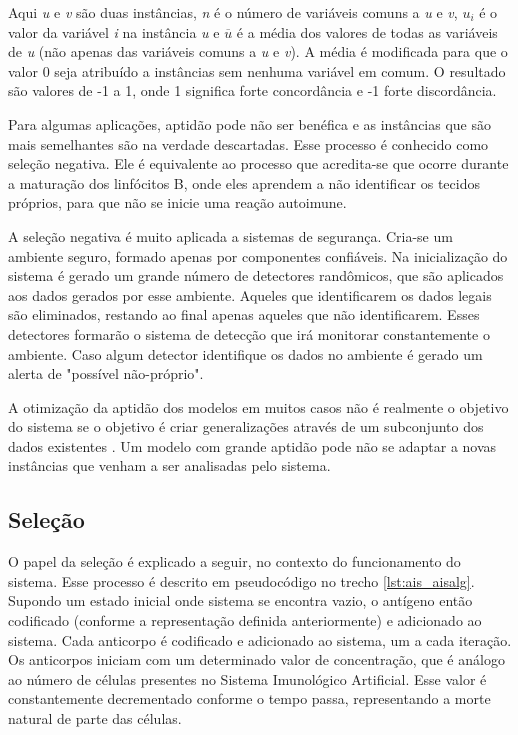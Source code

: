 Aqui \emph{u} e \emph{v} são duas instâncias, \emph{n} é o número de variáveis comuns a \emph{u} e \emph{v}, \emph{$u_i$} é o valor da variável \emph{i} na instância \emph{u} e \emph{$\overline{u}$} é a média dos valores de todas as variáveis de \emph{u} (não apenas das variáveis comuns a \emph{u} e \emph{v}). A média é modificada para que o valor 0 seja atribuído a instâncias sem nenhuma variável em comum. O resultado são valores de -1 a 1, onde 1 significa forte concordância e -1 forte discordância.

Para algumas aplicações, aptidão pode não ser benéfica e as instâncias que são mais semelhantes são na verdade descartadas. Esse processo é conhecido como seleção negativa. Ele é equivalente ao processo que acredita-se que ocorre durante a maturação dos linfócitos B, onde eles aprendem a não identificar os tecidos próprios, para que não se inicie uma reação autoimune.

A seleção negativa é muito aplicada a sistemas de segurança. Cria-se um ambiente seguro, formado apenas por componentes confiáveis. Na inicialização do sistema é gerado um grande número de detectores randômicos, que são aplicados aos dados gerados por esse ambiente. Aqueles que identificarem os dados legais são eliminados, restando ao final apenas aqueles que não identificarem. Esses detectores formarão o sistema de detecção que irá monitorar constantemente o ambiente. Caso algum detector identifique os dados no ambiente é gerado um alerta de "possível não-próprio".

A otimização da aptidão dos modelos em muitos casos não é realmente o objetivo do sistema se o objetivo é criar generalizações através de um subconjunto dos dados existentes \cite{Hand2001}. Um modelo com grande aptidão pode não se adaptar a novas instâncias que venham a ser analisadas pelo sistema.

\subsection{Seleção}

O papel da seleção é explicado a seguir, no contexto do funcionamento do sistema. Esse processo é descrito em pseudocódigo no trecho \ref{lst:ais_aisalg}. Supondo um estado inicial onde sistema se encontra vazio, o antígeno então codificado (conforme a representação definida anteriormente) e adicionado ao sistema. Cada anticorpo é codificado e adicionado ao sistema, um a cada iteração. Os anticorpos iniciam com um determinado valor de concentração, que é análogo ao número de células presentes no Sistema Imunológico Artificial. Esse valor é constantemente decrementado conforme o tempo passa, representando a morte natural de parte das células.

